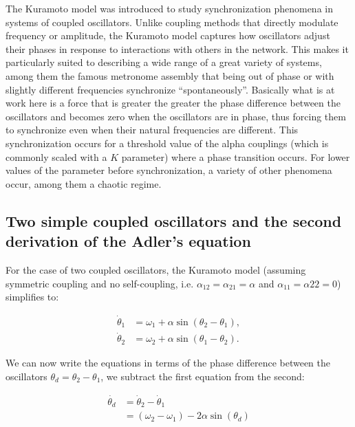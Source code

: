 \documentclass{article}
\begin{document}
The Kuramoto model was introduced to study synchronization phenomena in systems of coupled oscillators. 
Unlike coupling methods that directly modulate frequency or amplitude, the Kuramoto model captures how oscillators adjust their phases in response to interactions with others in the network. 
This makes it particularly suited to describing a wide range of a great variety of systems, among them the famous metronome assembly that being out of phase or with slightly different frequencies synchronize “spontaneously”. 
Basically what is at work here is a force that is greater the greater the phase difference between the oscillators and becomes zero when the oscillators are in phase, thus forcing them to synchronize even when their natural frequencies are different. 
This synchronization occurs for a threshold value of the alpha couplings (which is commonly scaled with a $K$ parameter) where a phase transition occurs.
For lower values of the parameter before synchronization, a variety of other phenomena occur, among them a chaotic regime.




\subsection{Two simple coupled oscillators and the second derivation of the Adler's equation}

For the case of two coupled oscillators, the Kuramoto model (assuming symmetric coupling and no self-coupling, i.e. $\alpha_{12}=\alpha_{21}=\alpha$ and $\alpha_{11}=\alpha{22}=0$) simplifies to:

\begin{subequations} \label{eq_twocoupled}
\begin{align} 
    \dot{\theta}_1 &= \omega_1 + \alpha \sin(\theta_2 - \theta_1), \\
    \dot{\theta}_2 &= \omega_2 + \alpha \sin(\theta_1 - \theta_2).
\end{align}
\end{subequations}

We can now write the equations in terms of the phase difference between the oscillators $\theta_d = \theta_2 - \theta_1$, we subtract the first equation from the second:

\begin{subequations} \label{eq_twocoupledb}
\begin{align} 
    \dot{\theta_d} &= \dot{\theta}_2 - \dot{\theta}_1 \\
    &= (\omega_2 - \omega_1) - 2\alpha \sin(\theta_d)
\end{align}
\end{subequations}
\end{document}
